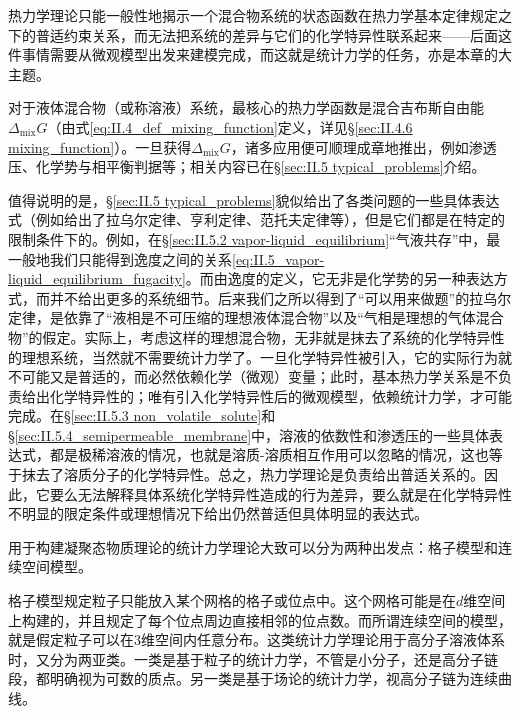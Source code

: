 \documentclass[main.tex]{subfiles}
\begin{document}
热力学理论只能一般性地揭示一个混合物系统的状态函数在热力学基本定律规定之下的普适约束关系，而无法把系统的差异与它们的化学特异性联系起来——后面这件事情需要从微观模型出发来建模完成，而这就是统计力学的任务，亦是本章的大主题。

对于液体混合物（或称溶液）系统，最核心的热力学函数是混合吉布斯自由能$\Delta_\text{mix} G$（由式\eqref{eq:II.4_def_mixing_function}定义，详见\S\ref{sec:II.4.6 mixing_function}）。一旦获得$\Delta_\text{mix} G$，诸多应用便可顺理成章地推出，例如渗透压、化学势与相平衡判据等；相关内容已在\S\ref{sec:II.5 typical_problems}介绍。

值得说明的是，\S\ref{sec:II.5 typical_problems}貌似给出了各类问题的一些具体表达式（例如给出了拉乌尔定律、亨利定律、范托夫定律等），但是它们都是在特定的限制条件下的。例如，在\S\ref{sec:II.5.2 vapor-liquid_equilibrium}“气液共存”中，最一般地我们只能得到逸度之间的关系\eqref{eq:II.5_vapor-liquid_equilibrium_fugacity}。而由逸度的定义，它无非是化学势的另一种表达方式，而并不给出更多的系统细节。后来我们之所以得到了“可以用来做题”的拉乌尔定律，是依靠了“液相是不可压缩的理想液体混合物”以及“气相是理想的气体混合物”的假定。实际上，考虑这样的理想混合物，无非就是抹去了系统的化学特异性的理想系统，当然就不需要统计力学了。一旦化学特异性被引入，它的实际行为就不可能又是普适的，而必然依赖化学（微观）变量；此时，基本热力学关系是不负责给出化学特异性的；唯有引入化学特异性后的微观模型，依赖统计力学，才可能完成。在\S\ref{sec:II.5.3 non_volatile_solute}和\S\ref{sec:II.5.4_semipermeable_membrane}中，溶液的依数性和渗透压的一些具体表达式，都是极稀溶液的情况，也就是溶质-溶质相互作用可以忽略的情况，这也等于抹去了溶质分子的化学特异性。总之，热力学理论是负责给出普适关系的。因此，它要么无法解释具体系统化学特异性造成的行为差异，要么就是在化学特异性不明显的限定条件或理想情况下给出仍然普适但具体明显的表达式。

用于构建凝聚态物质理论的统计力学理论大致可以分为两种出发点：格子模型和连续空间模型。

格子模型规定粒子只能放入某个网格的格子或位点中。这个网格可能是在$d$维空间上构建的，并且规定了每个位点周边直接相邻的位点数。而所谓连续空间的模型，就是假定粒子可以在3维空间内任意分布。这类统计力学理论用于高分子溶液体系时，又分为两亚类。一类是基于粒子的统计力学，不管是小分子，还是高分子链段，都明确视为可数的质点。另一类是基于场论的统计力学，视高分子链为连续曲线。
\end{document}
